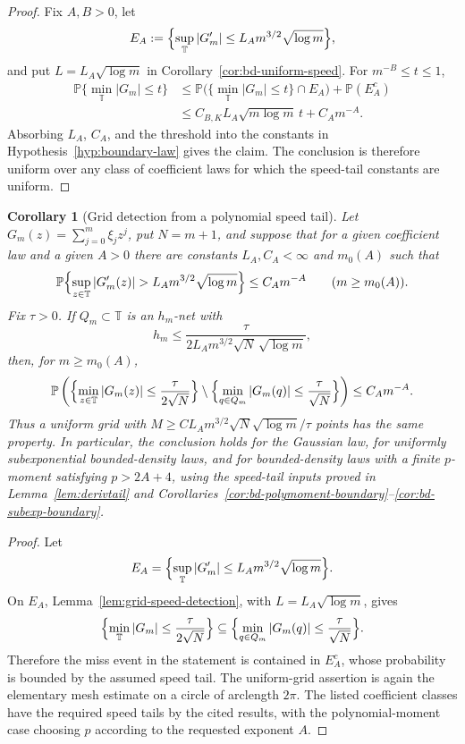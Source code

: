 \documentclass[11pt]{amsart}
\numberwithin{equation}{section}
\newtheorem{corollary}[theorem]{Corollary}
\theoremstyle{definition}
\theoremstyle{remark}
\newcommand{\T}{\mathbb T}
\newcommand{\Prob}{\mathbb P}
\newcommand{\abs}[1]{\left\lvert #1\right\rvert}
\begin{document}
\begin{proof}
Fix \(A,B>0\), let
\[
  E_A:=\Bigl\{\sup_{\T}\abs{G_m'}\le L_A m^{3/2}\sqrt{\log m}\Bigr\},
\]
and put \(L=L_A\sqrt{\log m}\) in
Corollary~\ref{cor:bd-uniform-speed}.  For \(m^{-B}\le t\le1\),
\[
\begin{aligned}
  \Prob\{\min_{\T}\abs{G_m}\le t\}
  &\le
  \Prob\bigl(\{\min_{\T}\abs{G_m}\le t\}\cap E_A\bigr)
  +\Prob(E_A^c) \\
  &\le C_{B,K}L_A\sqrt{m\log m}\,t+C_A m^{-A}.
\end{aligned}
\]
Absorbing \(L_A\), \(C_A\), and the threshold into the constants in
Hypothesis~\ref{hyp:boundary-law} gives the claim.  The conclusion is therefore
uniform over any class of coefficient laws for which the speed-tail constants
are uniform.
\end{proof}

\begin{corollary}[Grid detection from a polynomial speed tail]
\label{cor:speedtail-grid-detects}
Let \(G_m(z)=\sum_{j=0}^m\xi_jz^j\), put \(N=m+1\), and suppose that for a
given coefficient law and a given \(A>0\) there are constants \(L_A,C_A<\infty\)
and \(m_0(A)\) such that
\[
  \Prob\Bigl\{\sup_{z\in\T}\abs{G_m'(z)}>L_A m^{3/2}\sqrt{\log m}\Bigr\}
  \le C_A m^{-A}
  \qquad(m\ge m_0(A)).
\]
Fix \(\tau>0\).  If \(Q_m\subset\T\) is an \(h_m\)-net with
\[
  h_m\le \frac{\tau}{2L_A m^{3/2}\sqrt N\,\sqrt{\log m}},
\]
then, for \(m\ge m_0(A)\),
\[
  \Prob\left(
    \Bigl\{\min_{z\in\T}\abs{G_m(z)}\le \frac{\tau}{2\sqrt N}\Bigr\}
    \setminus
    \Bigl\{\min_{q\in Q_m}\abs{G_m(q)}\le \frac{\tau}{\sqrt N}\Bigr\}
  \right)
  \le C_A m^{-A}.
\]
Thus a uniform grid with \(M\ge C L_A m^{3/2}\sqrt N\sqrt{\log m}/\tau\)
points has the same property.  In particular, the conclusion holds for the
Gaussian law, for uniformly subexponential bounded-density laws, and for
bounded-density laws with a finite \(p\)-moment satisfying \(p>2A+4\), using
the speed-tail inputs proved in Lemma~\ref{lem:derivtail} and
Corollaries~\ref{cor:bd-polymoment-boundary}--\ref{cor:bd-subexp-boundary}.
\end{corollary}

\begin{proof}
Let
\[
  E_A=\Bigl\{\sup_{\T}\abs{G_m'}\le L_A m^{3/2}\sqrt{\log m}\Bigr\}.
\]
On \(E_A\), Lemma~\ref{lem:grid-speed-detection}, with
\(L=L_A\sqrt{\log m}\), gives
\[
  \Bigl\{\min_{\T}\abs{G_m}\le \frac{\tau}{2\sqrt N}\Bigr\}
  \subseteq
  \Bigl\{\min_{q\in Q_m}\abs{G_m(q)}\le \frac{\tau}{\sqrt N}\Bigr\}.
\]
Therefore the miss event in the statement is contained in \(E_A^c\), whose
probability is bounded by the assumed speed tail.  The uniform-grid assertion
is again the elementary mesh estimate on a circle of arclength \(2\pi\).
The listed coefficient classes have the required speed tails by the cited
results, with the polynomial-moment case choosing \(p\) according to the
requested exponent \(A\).
\end{proof}
\end{document}
